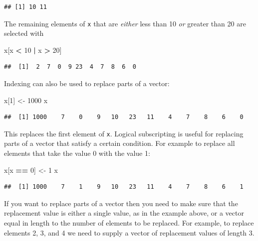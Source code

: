 \documentclass[
]{book}
\newenvironment{Shaded}{\begin{snugshade}}{\end{snugshade}}
\newcommand{\DecValTok}[1]{\textcolor[rgb]{0.00,0.00,0.81}{#1}}
\newcommand{\NormalTok}[1]{#1}
\newcommand{\OtherTok}[1]{\textcolor[rgb]{0.56,0.35,0.01}{#1}}
\newcommand{\SpecialCharTok}[1]{\textcolor[rgb]{0.81,0.36,0.00}{\textbf{#1}}}
\theoremstyle{definition}
\theoremstyle{definition}
\theoremstyle{definition}
\theoremstyle{definition}
\theoremstyle{remark}
\begin{document}
\begin{verbatim}
## [1] 10 11
\end{verbatim}

The remaining elements of \texttt{x} that are \emph{either} less than 10
\emph{or} greater than 20 are selected with

\begin{Shaded}
\begin{Highlighting}[]
\NormalTok{x[x }\SpecialCharTok{\textless{}} \DecValTok{10} \SpecialCharTok{|}\NormalTok{ x }\SpecialCharTok{\textgreater{}} \DecValTok{20}\NormalTok{]}
\end{Highlighting}
\end{Shaded}

\begin{verbatim}
##  [1]  2  7  0  9 23  4  7  8  6  0
\end{verbatim}

Indexing can also be used to replace parts of a vector:

\begin{Shaded}
\begin{Highlighting}[]
\NormalTok{x[}\DecValTok{1}\NormalTok{] }\OtherTok{\textless{}{-}} \DecValTok{1000}
\NormalTok{x}
\end{Highlighting}
\end{Shaded}

\begin{verbatim}
##  [1] 1000    7    0    9   10   23   11    4    7    8    6    0
\end{verbatim}

This replaces the first element of \texttt{x}. Logical subscripting is
useful for replacing parts of a vector that satisfy a certain condition.
For example to replace all elements that take the value 0 with the value 1:

\begin{Shaded}
\begin{Highlighting}[]
\NormalTok{x[x }\SpecialCharTok{==} \DecValTok{0}\NormalTok{] }\OtherTok{\textless{}{-}} \DecValTok{1}
\NormalTok{x}
\end{Highlighting}
\end{Shaded}

\begin{verbatim}
##  [1] 1000    7    1    9   10   23   11    4    7    8    6    1
\end{verbatim}

If you want to replace parts of a vector then you need to make sure
that the replacement value is either a single value, as in the example
above, or a vector equal in length to the number of elements to be
replaced. For example, to replace elements 2, 3, and 4 we need to
supply a vector of replacement values of length 3.
\end{document}
